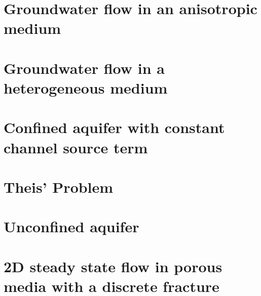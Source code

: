 \newpage
\section{Groundwater flow in an anisotropic medium}
\label{GWF:anisotropic}

\section{Groundwater flow in a heterogeneous medium}
\label{GWF:heterogeneous}

\section{Confined aquifer with constant channel source term}
\label{GWF:channel_source}

\section{Theis' Problem}
\label{GWF:Theis}

\section{Unconfined aquifer}
\label{GWF:UC}

\section{2D steady state flow in porous media with a discrete fracture}
\label{GWF:Hmf}


